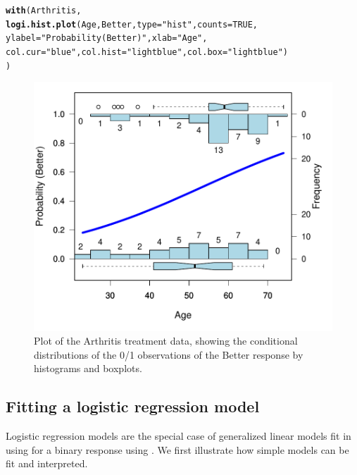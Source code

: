 \documentclass[11pt]{book}\usepackage[]{graphicx}\usepackage[]{color}
\makeatletter
\newcommand{\hlnum}[1]{\textcolor[rgb]{0.686,0.059,0.569}{#1}}%
\newcommand{\hlstr}[1]{\textcolor[rgb]{0.192,0.494,0.8}{#1}}%
\newcommand{\hlstd}[1]{\textcolor[rgb]{0.345,0.345,0.345}{#1}}%
\newcommand{\hlkwc}[1]{\textcolor[rgb]{0.333,0.667,0.333}{#1}}%
\newcommand{\hlkwd}[1]{\textcolor[rgb]{0.737,0.353,0.396}{\textbf{#1}}}%
\newenvironment{kframe}{%
 \def\at@end@of@kframe{}%
 \ifinner\ifhmode%
  \def\at@end@of@kframe{\end{minipage}}%
  \begin{minipage}{\columnwidth}%
 \fi\fi%
 \def\FrameCommand##1{\hskip\@totalleftmargin \hskip-\fboxsep
 \colorbox{shadecolor}{##1}\hskip-\fboxsep
     \hskip-\linewidth \hskip-\@totalleftmargin \hskip\columnwidth}%
 \MakeFramed {\advance\hsize-\width
   \@totalleftmargin\z@ \linewidth\hsize
   \@setminipage}}%
 {\par\unskip\endMakeFramed%
 \at@end@of@kframe}
\newenvironment{knitrout}{}{} %
\renewenvironment{knitrout}{\small\renewcommand{\baselinestretch}{.85}}{} %
\makeatother
\begin{document}
\begin{knitrout}\footnotesize
{}\color{fgcolor}\begin{kframe}
\begin{alltt}
\hlkwd{with}\hlstd{(Arthritis,}
     \hlkwd{logi.hist.plot}\hlstd{(Age, Better,} \hlkwc{type}\hlstd{=}\hlstr{"hist"}\hlstd{,} \hlkwc{counts}\hlstd{=}\hlnum{TRUE}\hlstd{,}
                    \hlkwc{ylabel}\hlstd{=}\hlstr{"Probability (Better)"}\hlstd{,} \hlkwc{xlab}\hlstd{=}\hlstr{"Age"}\hlstd{,}
                    \hlkwc{col.cur}\hlstd{=}\hlstr{"blue"}\hlstd{,} \hlkwc{col.hist}\hlstd{=}\hlstr{"lightblue"}\hlstd{,} \hlkwc{col.box}\hlstd{=}\hlstr{"lightblue"}\hlstd{)}
  \hlstd{)}
\end{alltt}
\end{kframe}\begin{figure}[!htbp]


\centerline{\includegraphics[width=.6\textwidth]{ch07/fig/arth-logi-hist-1} }

\caption[Plot of the Arthritis treatment data, showing the conditional distributions of the 0/1 observations of the Better response by histograms and boxplots]{Plot of the Arthritis treatment data, showing the conditional distributions of the 0/1 observations of the Better response by histograms and boxplots.\label{fig:arth-logi-hist}}
\end{figure}


\end{knitrout}


\subsection{Fitting a logistic regression model}\label{sec:logist-fitting}

Logistic regression models are the special case of generalized linear models
fit in \R using  for a binary response using .
We first illustrate how simple models can be fit and interpreted.
\end{document}
